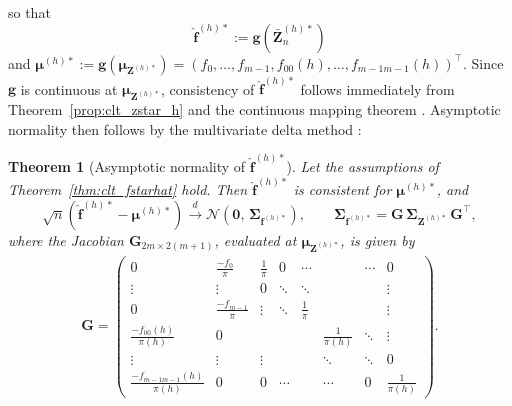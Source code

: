 ﻿\documentclass[12pt,a4paper]{scrreprt}
\newtheorem{theorem}{Theorem}[chapter]
\theoremstyle{definition}
\begin{document}
so that  \label{def:f_h_hat}
\[
    \hat{\boldsymbol{f}}^{(h)*} := 
        \boldsymbol{g}(\bar{\boldsymbol{Z}}^{(h)*}_n) 
\] 
and $\boldsymbol{\mu}^{(h)*} := 
\boldsymbol{g}(\boldsymbol{\mu}_{\boldsymbol{Z}^{(h)*}}) 
= (f_0,\ldots,f_{m-1},f_{00}(h),\ldots,f_{m-1m-1}(h))^\top$. Since $\boldsymbol{g}$ is continuous at 
$\boldsymbol{\mu}_{\boldsymbol{Z}^{(h)*}}$, consistency of 
$\hat{\boldsymbol{f}}^{(h)*}$ follows immediately from 
Theorem~\ref{prop:clt_zstar_h} and the continuous mapping theorem 
\citep[Theorem~3.27]{kallenberg_2021}. Asymptotic normality then 
follows by the multivariate delta method 
\citep[Chapter~3]{VanderVaart1998}:
\begin{theorem}[Asymptotic normality of $\hat{\boldsymbol{f}}^{(h)*}$]
\label{thm:clt_fhat_h}
Let the assumptions of Theorem~\ref{thm:clt_fstarhat} hold. Then 
$\hat{\boldsymbol{f}}^{(h)*}$ is consistent for $\boldsymbol{\mu}^{(h)*}$, 
and
\[
    \sqrt{n}\!\left(\hat{\boldsymbol{f}}^{(h)*} 
    - \boldsymbol{\mu}^{(h)*}\right)
    \xrightarrow{d} \mathcal{N}\!\left(\boldsymbol{0},\, 
    \boldsymbol{\Sigma}_{\boldsymbol{f}^{(h)*}}\right),
    \qquad
    \boldsymbol{\Sigma}_{\boldsymbol{f}^{(h)*}} 
    = \boldsymbol{G}\,\boldsymbol{\Sigma}_{\boldsymbol{Z}^{(h)*}}\,
    \boldsymbol{G}^\top,
\]
where the Jacobian $\boldsymbol{G}_{2m\times 2(m+1)}$, evaluated at 
$\boldsymbol{\mu}_{\boldsymbol{Z}^{(h)*}}$, is given by
\begin{align*}
    \boldsymbol{G} =
    \begin{pmatrix}
    0 & \frac{-f_0}{\pi} & \frac{1}{\pi}& 0 &\cdots&&\cdots & 0 \\
    \vdots &\vdots & 0 &\ddots & \ddots &&& \vdots \\
    0 & \frac{-f_{m-1}}{\pi}& \vdots & \ddots & \frac{1}{\pi} & & &\vdots\\
    \frac{-f_{00}(h)}{\pi(h)} & 0 & & & & \frac{1}{\pi(h)}&\ddots&\vdots\\
    \vdots & \vdots & \vdots & & & \ddots & \ddots&0\\
    \frac{-f_{m-1m-1}(h)}{\pi(h)} & 0 & 0 & \cdots& 
    &\cdots & 0&\frac{1}{\pi(h)}      
    \end{pmatrix}.
\end{align*}
\end{theorem}
\end{document}
